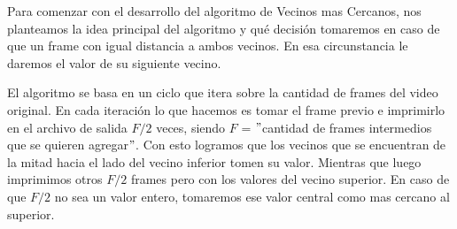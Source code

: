 \par Para comenzar con el desarrollo del algoritmo de Vecinos mas Cercanos, nos planteamos la idea principal del algoritmo y qu\'e decisi\'on tomaremos en caso de que un frame con igual distancia a ambos vecinos. En esa circunstancia le daremos el valor de su siguiente vecino.

\par El algoritmo se basa en un ciclo que itera sobre la cantidad de frames del video original. En cada iteraci\'on lo que hacemos es tomar el frame previo e imprimirlo en el archivo de salida $F / 2$ veces, siendo $F$ = $"$cantidad de frames intermedios que se quieren agregar$"$. Con esto logramos que los vecinos que se encuentran de la mitad hacia el lado del vecino inferior tomen su valor. Mientras que luego imprimimos otros $F / 2$ frames pero con los valores del vecino superior. En caso de que $F / 2$ no sea un valor entero, tomaremos ese valor central como mas cercano al superior.